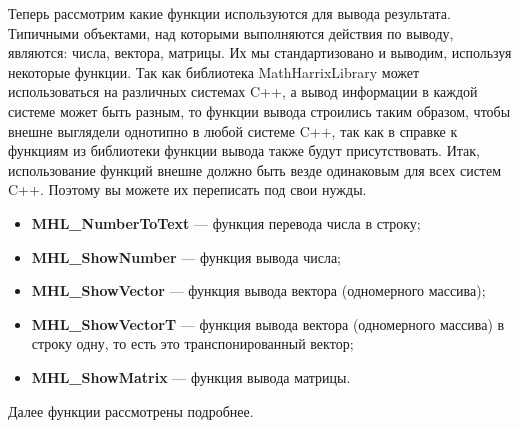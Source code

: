 Теперь рассмотрим какие функции используются для вывода результата. Типичными объектами, над которыми выполняются действия по выводу, являются: числа, вектора, матрицы. Их мы стандартизовано и выводим, используя некоторые функции. Так как библиотека MathHarrixLibrary может использоваться на различных системах C++, а вывод информации в каждой системе может быть разным, то функции вывода строились таким образом, чтобы внешне выглядели однотипно в любой системе C++, так как в справке к функциям из библиотеки функции вывода также будут присутствовать. Итак, использование функций внешне должно быть везде одинаковым для всех систем C++.  Поэтому вы можете их переписать под свои нужды.


\begin{itemize}
\item \textbf{MHL\_NumberToText} --- функция перевода числа в строку; 
\item \textbf{MHL\_ShowNumber} --- функция вывода числа;
\item \textbf{MHL\_ShowVector} --- функция вывода вектора (одномерного массива);
\item \textbf{MHL\_ShowVectorT} --- функция вывода вектора (одномерного массива) в строку одну, то есть это транспонированный вектор;
\item \textbf{MHL\_ShowMatrix} --- функция вывода матрицы.
\end{itemize}

Далее функции рассмотрены подробнее.

